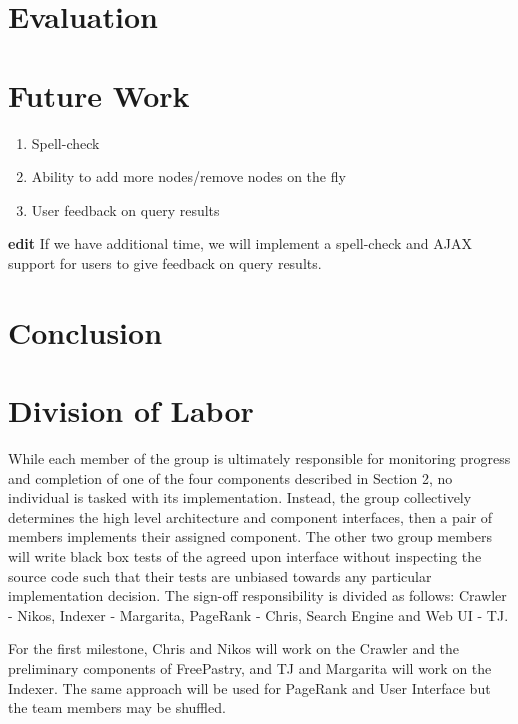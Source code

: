 \documentclass[11pt, letterpaper, oneside, twocolumn]{article}
\begin{document}
\section{Evaluation}
\label{sec:evaluation}

\section{Future Work}
\label{sec:future}

\begin{enumerate}
\item Spell-check
\item Ability to add more nodes/remove nodes on the fly
\item User feedback on query results
\end{enumerate}


\textbf{edit}
If we have additional time, we will implement a spell-check and AJAX support for users to give feedback on query results.


\section{Conclusion}
\label{sec:conculsion}

\section{ Division of Labor }
\label{sec:labor}

While each member of the group is ultimately responsible for monitoring progress and completion of one of the four components described in Section 2, no individual is tasked with its implementation.
Instead, the group collectively determines the high level architecture and component interfaces, then a pair of members implements their assigned component.
The other two group members will write black box tests of the agreed upon interface without inspecting the source code such that their tests are unbiased towards any particular implementation decision.
The sign-off responsibility is divided as follows: Crawler - Nikos, Indexer - Margarita, PageRank - Chris, Search Engine and Web UI - TJ.

For the first milestone, Chris and Nikos will work on the Crawler and the preliminary components of FreePastry, and TJ and Margarita will work on the Indexer.
The same approach will be used for PageRank and User Interface but the team members may be shuffled.
\end{document}
